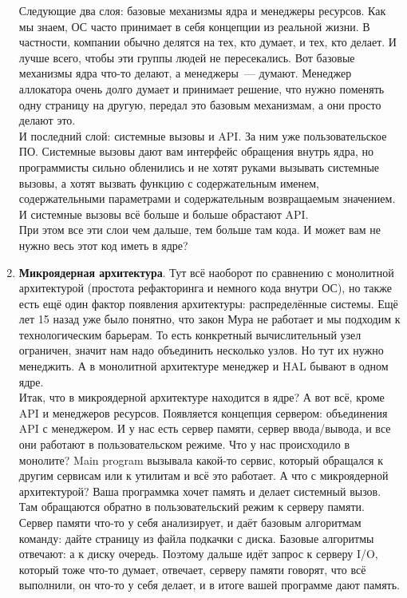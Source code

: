 \documentclass{article}
\begin{document}
\begin{enumerate}
        Следующие два слоя: базовые механизмы ядра и менеджеры ресурсов. Как мы знаем, ОС часто принимает в себя концепции из реальной жизни. В частности, компании обычно делятся на тех, кто думает, и тех, кто делает. И лучше всего, чтобы эти группы людей не пересекались. Вот базовые механизмы ядра что-то делают, а менеджеры~--- думают. Менеджер аллокатора очень долго думает и принимает решение, что нужно поменять одну страницу на другую, передал это базовым механизмам, а они просто делают это.\\
        И последний слой: системные вызовы и API. За ним уже пользовательское ПО. Системные вызовы дают вам интерфейс обращения внутрь ядра, но программисты сильно обленились и не хотят руками вызывать системные вызовы, а хотят вызвать функцию с содержательным именем, содержательными параметрами и содержательным возвращаемым значением. И системные вызовы всё больше и больше обрастают API.\\
        При этом все эти слои чем дальше, тем больше там кода. И может вам не нужно весь этот код иметь в ядре?
        \item \textbf{Микроядерная архитектура}. Тут всё наоборот по сравнению с монолитной архитектурой (простота рефакторинга и немного кода внутри ОС), но также есть ещё один фактор появления архитектуры: распределённые системы. Ещё лет 15 назад уже было понятно, что закон Мура не работает и мы подходим к технологическим барьерам. То есть конкретный вычислительный узел ограничен, значит нам надо объединить несколько узлов. Но тут их нужно менеджить. А в монолитной архитектуре менеджер и HAL бывают в одном ядре.\\
        Итак, что в микроядерной архитектуре находится в ядре? А вот всё, кроме API и менеджеров ресурсов. Появляется концепция сервером: объединения API с менеджером. И у нас есть сервер памяти, сервер ввода/вывода, и все они работают в пользовательском режиме. Что у нас происходило в монолите? Main program вызывала какой-то сервис, который обращался к другим сервисам или к утилитам и всё это работает. А что с микроядерной архитектурой? Ваша программка хочет память и делает системный вызов. Там обращаются обратно в пользовательский режим к серверу памяти. Сервер памяти что-то у себя анализирует, и даёт базовым алгоритмам команду: дайте страницу из файла подкачки с диска. Базовые алгоритмы отвечают: а к диску очередь. Поэтому дальше идёт запрос к серверу I/O, который тоже что-то думает, отвечает, серверу памяти говорят, что всё выполнили, он что-то у себя делает, и в итоге вашей программе дают память.\\

\end{enumerate}
\end{document}
